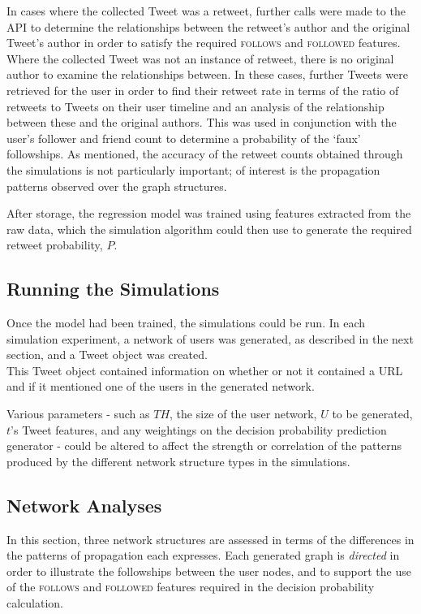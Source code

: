 In cases where the collected Tweet was a retweet, further calls were made to the API to determine the relationships between the retweet's author and the original Tweet's author in order to satisfy the required \textsc{follows} and \textsc{followed} features.
Where the collected Tweet was not an instance of retweet, there is no original author to examine the relationships between. In these cases, further Tweets were retrieved for the user in order to find their retweet rate in terms of the ratio of retweets to Tweets on their user timeline and an analysis of the relationship between these and the original authors. This was used in conjunction with the user's follower and friend count to determine a probability of the `faux' followships. As mentioned, the accuracy of the retweet counts obtained through the simulations is not particularly important; of interest is the propagation patterns observed over the graph structures.

After storage, the regression model was trained using features extracted from the raw data, which the simulation algorithm could then use to generate the required retweet probability, $P$.


\subsection{Running the Simulations}
Once the model had been trained, the simulations could be run. In each simulation experiment, a network of users was generated, as described in the next section, and a Tweet object was created.\\
This Tweet object contained information on whether or not it contained a URL and if it mentioned one of the users in the generated network. 

Various parameters - such as $TH$, the size of the user network, $U$ to be generated, $t$'s Tweet features, and any weightings on the decision probability prediction generator - could be altered to affect the strength or correlation of the patterns produced by the different network structure types in the simulations.


\subsection{Network Analyses}
In this section, three network structures are assessed in terms of the differences in the patterns of propagation each expresses. Each generated graph is \textit{directed} in order to illustrate the followships between the user nodes, and to support the use of the \textsc{follows} and \textsc{followed} features required in the decision probability calculation.

